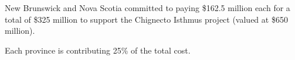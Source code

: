 \documentclass{article}
\begin{document}

New Brunswick and Nova Scotia committed to paying \$162.5 million each for a total of \$325 million to support the Chignecto Isthmus project (valued at \$650 million).

Each province is contributing 25\% of the total cost.
\end{document}

